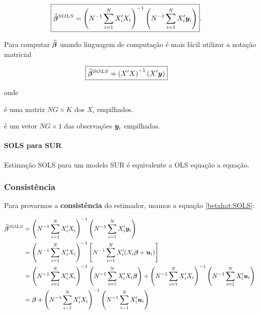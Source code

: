 \documentclass[11pt, oneside, a4paper, article]{article}
\numberwithin{equation}{section}
\begin{document}
\vspace{-1 em}
\begin{align} \label{betahat:SOLS}
\Aboxed{
\betahatbold^{SOLS} &=
\left( N^{-1} \sum_{i=1}^{N} X_{i}' X_{i}   \right)^{-1}
\left( N^{-1} \sum_{i=1}^{N} X_{i}' \mbs{y}_{i}   \right)
}.
\end{align}

Para computar $\widehat{\boldsymbol{\beta}}$ usando linguagem de computação é mais fácil utilizar a notação matricial

\vspace{-1 em}
\begin{align} \label{betahat:SOLS:mat}
\Aboxed{
\betahatbold^{SOLS} &=
\left(  X' X   \right)^{-1} \left(  X' \mbs{y}   \right)
}
\end{align}

\noindent
onde

\vspace{-1 em}
\begin{description}[itemsep = -1ex]
\item [$X \equiv (X_{1}', \dots, X_{N}')$]  é uma matriz $NG \times K$ dos $X_{i}$ empilhados.

\item [$\mbs{y} \equiv (\mbs{y}_{1}', \dots, \mbs{y}_{N}')$] é um vetor $NG \times 1$ das observações $\boldsymbol{y}_{i}$ empilhadas.
\end{description}

\paragraph{SOLS para SUR} Estimação SOLS para um modelo SUR é equivalente a OLS equação a equação.

\subsubsection{Consistência}

Para provarmos a \textbf{consistência} do estimador, usamos a equação \eqref{betahat:SOLS}:

\vspace{-1 em}
\begin{align*}
\widehat{\boldsymbol{\beta}}^{SOLS} &=
\left( N^{-1}\sum_{i=1}^{N} X_{i}' X_{i}   \right)^{-1}
\left( N^{-1}\sum_{i=1}^{N} X_{i}' \boldsymbol{y}_{i}   \right)
\\ &=
\left( N^{-1}\sum_{i=1}^{N} X_{i}' X_{i}   \right)^{-1}
\left[ N^{-1}\sum_{i=1}^{N} X_{i}' (X_{i} \boldsymbol{\beta} + \boldsymbol{u}_{i})   \right]
\\ &=
\left( N^{-1}\sum_{i=1}^{N} X_{i}' X_{i}   \right)^{-1}
\left( N^{-1}\sum_{i=1}^{N} X_{i}' X_{i} \boldsymbol{\beta}    \right)
+
\left( N^{-1}\sum_{i=1}^{N} X_{i}' X_{i}   \right)^{-1}
\left( N^{-1}\sum_{i=1}^{N} X_{i}' \boldsymbol{u}_{i}   \right)
\\ &=
\boldsymbol{\beta}
+
\left( N^{-1}\sum_{i=1}^{N} X_{i}' X_{i}   \right)^{-1}
\left( N^{-1}\sum_{i=1}^{N} X_{i}' \boldsymbol{u}_{i}   \right)
\end{align*}
\end{document}
